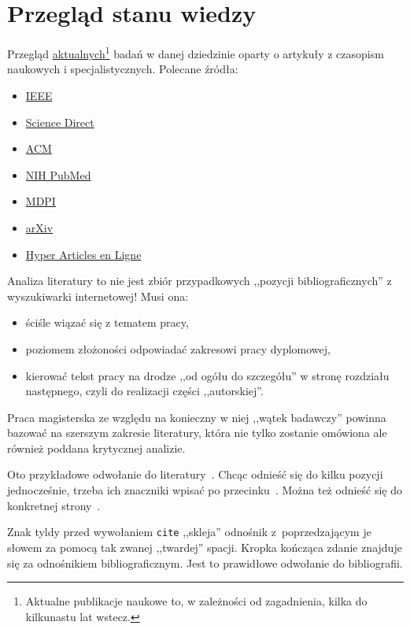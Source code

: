 \section{Przegląd stanu wiedzy}

Przegląd \underline{aktualnych}\footnote{Aktualne publikacje naukowe to, w zależności od zagadnienia, kilka do kilkunastu lat wstecz.} badań w danej dziedzinie oparty o artykuły z czasopism naukowych i specjalistycznych. Polecane źródła:

\begin{itemize}
	\item \href{http://eczyt.bg.pw.edu.pl/han/ieee-import/}{IEEE}
	\item \href{http://eczyt.bg.pw.edu.pl/han/ScienceDirectOnLine}{Science Direct}
	\item \href{http://eczyt.bg.pw.edu.pl/han/ACMDigitalLibrary}{ACM}
	\item \href{https://pubmed.ncbi.nlm.nih.gov/}{NIH PubMed}
	\item \href{https://www.mdpi.com/}{MDPI}
	\item \href{https://arxiv.org/}{arXiv}
	\item \href{https://hal.science/}{Hyper Articles en Ligne}
\end{itemize}

Analiza literatury to nie jest zbiór przypadkowych ,,pozycji bibliograficznych'' z wyszukiwarki internetowej! Musi ona:

\begin{itemize}
	\item ściśle wiązać się z tematem pracy,
	\item poziomem złożoności odpowiadać zakresowi pracy dyplomowej, 
	\item kierować tekst pracy na drodze ,,od ogółu do szczegółu'' w stronę rozdziału następnego, czyli do realizacji części ,,autorskiej''.
\end{itemize}

Praca magisterska ze względu na konieczny w niej ,,wątek badawczy'' powinna bazować na szerszym zakresie literatury, która nie tylko zostanie omówiona ale również poddana krytycznej analizie.

Oto przykładowe odwołanie do literatury~\cite{fowler2009}. Chcąc odnieść się do kilku pozycji jednocześnie, trzeba ich znaczniki wpisać po przecinku~\cite{maxwell1865,leksinski1995}. Można też odnieść się do konkretnej strony~\cite[s.~38]{leksinski1995}. 

Znak tyldy przed wywołaniem \texttt{cite} ,,skleja'' odnośnik z~poprzedzającym je słowem za pomocą tak zwanej ,,twardej'' spacji. Kropka kończąca zdanie znajduje się za odnośnikiem bibliograficznym. Jest to prawidłowe odwołanie do bibliografii.

